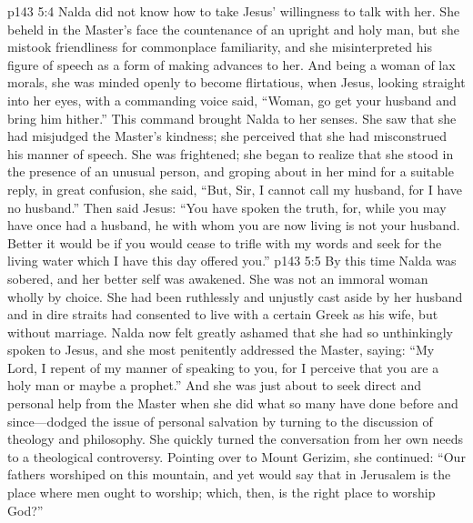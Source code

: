 \vs p143 5:4 Nalda did not know how to take Jesus’ willingness to talk with her. She beheld in the Master’s face the countenance of an upright and holy man, but she mistook friendliness for commonplace familiarity, and she misinterpreted his figure of speech as a form of making advances to her. And being a woman of lax morals, she was minded openly to become flirtatious, when Jesus, looking straight into her eyes, with a commanding voice said, \textcolor{ubdarkred}{“Woman, go get your husband and bring him hither.”} This command brought Nalda to her senses. She saw that she had misjudged the Master’s kindness; she perceived that she had misconstrued his manner of speech. She was frightened; she began to realize that she stood in the presence of an unusual person, and groping about in her mind for a suitable reply, in great confusion, she said, “But, Sir, I cannot call my husband, for I have no husband.” Then said Jesus: \textcolor{ubdarkred}{“You have spoken the truth, for, while you may have once had a husband, he with whom you are now living is not your husband. Better it would be if you would cease to trifle with my words and seek for the living water which I have this day offered you.”}
\vs p143 5:5 By this time Nalda was sobered, and her better self was awakened. She was not an immoral woman wholly by choice. She had been ruthlessly and unjustly cast aside by her husband and in dire straits had consented to live with a certain Greek as his wife, but without marriage. Nalda now felt greatly ashamed that she had so unthinkingly spoken to Jesus, and she most penitently addressed the Master, saying: “My Lord, I repent of my manner of speaking to you, for I perceive that you are a holy man or maybe a prophet.” And she was just about to seek direct and personal help from the Master when she did what so many have done before and since---dodged the issue of personal salvation by turning to the discussion of theology and philosophy. She quickly turned the conversation from her own needs to a theological controversy. Pointing over to Mount Gerizim, she continued: “Our fathers worshiped on this mountain, and yet  would say that in Jerusalem is the place where men ought to worship; which, then, is the right place to worship God?”
